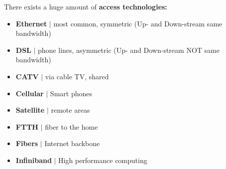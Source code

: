 \documentclass[a4paper, fontsize=8pt, landscape, DIV=1]{scrartcl}
\begin{document}
\begin{multicols*}{4}
				There exists a huge amount of \textbf{access technologies: }
				\begin{itemize}[noitemsep]
					\item \textbf{Ethernet} $\vert$ most common, symmetric (Up- and Down-stream same bandwidth)
					\item \textbf{DSL} $\vert$ phone lines, asymmetric (Up- and Down-stream NOT same bandwidth)
					\item \textbf{CATV} $\vert$ via cable TV, shared
					\item \textbf{Cellular} $\vert$ Smart phones 
					\item \textbf{Satellite} $\vert$ remote areas
					\item \textbf{FTTH} $\vert$ fiber to the home
					\item \textbf{Fibers} $\vert$ Internet backbone 
					\item \textbf{Infiniband} $\vert$ High performance computing 
				\end{itemize}
			\vspace{0.2cm}

\end{multicols*}
\end{document}
